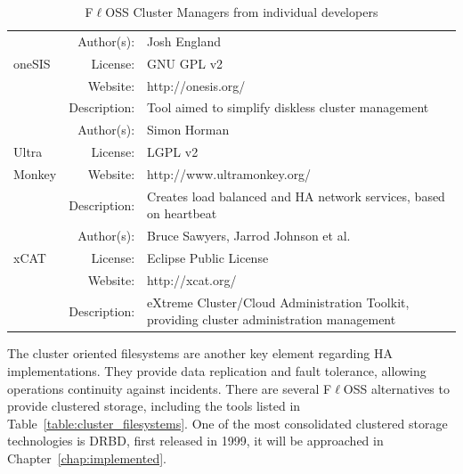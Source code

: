 \documentclass[a4paper, 12pt]{book}
\begin{document}
\begin{table}[H]
  \centering
  \begin{tabular}{ | m{2cm} | r  m{10cm} | }

    \hline    
		 & Author(s): & Josh England \\
      oneSIS	 & License: & GNU GPL v2 \\
		 & Website: & http://onesis.org/ \\
	 	 & Description: & Tool aimed to simplify diskless cluster management \\  
    \hline    
		 & Author(s): & Simon Horman \\
      Ultra	 & License: & LGPL v2 \\
	Monkey	 & Website: & http://www.ultramonkey.org/ \\
	 	 & Description: & Creates load balanced and HA network services, based on heartbeat \\
    \hline    
		 & Author(s): & Bruce Sawyers, Jarrod Johnson et al. \\
      xCAT	 & License: & Eclipse Public License \\
		 & Website: & http://xcat.org/ \\
	 	 & Description: & eXtreme Cluster/Cloud Administration Toolkit, providing cluster administration management \\
    \hline  

  \end{tabular}
\caption{F$\ell$OSS Cluster Managers from individual developers}
\label{table:cluster_managers_individuals}
\end{table}

\noindent The cluster oriented filesystems are another key element regarding HA implementations. They provide data replication and fault tolerance, allowing operations continuity against incidents. There are several F$\ell$OSS alternatives to provide clustered storage, including the tools listed in Table~\ref{table:cluster_filesystems}. One of the most consolidated clustered storage technologies is DRBD, first released in 1999, it will be approached in Chapter~\ref{chap:implemented}.
\end{document}
